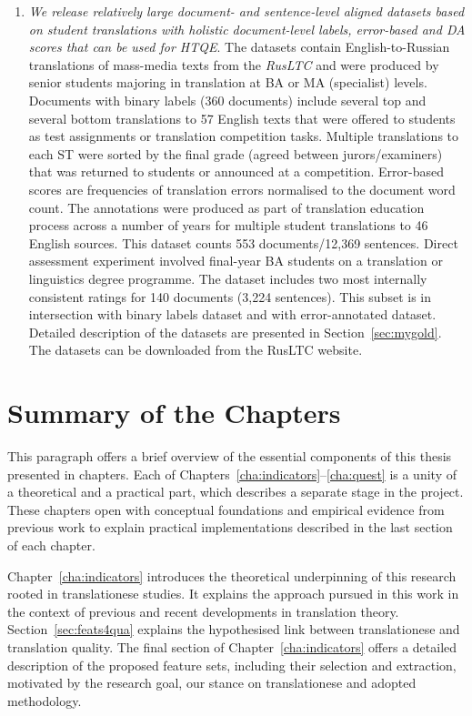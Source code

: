 \begin{enumerate}
	\item \textit{We release relatively large document- and sentence-level aligned datasets based on student translations with holistic document-level labels, error-based and DA scores that can be used for \gls{HTQE}}.
	The datasets contain English-to-Russian translations of mass-media texts from the \textit{RusLTC} and were produced by senior students majoring in translation at BA or MA (specialist) levels. 
	Documents with binary labels (360 documents) include several top and several bottom translations to 57 English texts that were offered to students as test assignments or translation competition tasks. Multiple translations to each ST were sorted by the final grade (agreed between jurors/examiners) that was returned to students or announced at a competition.
	Error-based scores are frequencies of translation errors normalised to the document word count. The annotations were produced as part of translation education process across a number of years for multiple student translations to 46 English sources. This dataset counts 553 documents/12,369 sentences.
	Direct assessment experiment involved final-year BA students on a translation or linguistics degree programme. The dataset includes two most internally consistent ratings for 140 documents (3,224 sentences). This subset is in intersection with binary labels dataset and with error-annotated dataset.
	Detailed description of the datasets are presented in Section~\ref{sec:mygold}. The datasets can be downloaded from the RusLTC website.
	
\end{enumerate}
\section{Summary of the Chapters}
This paragraph offers a brief overview of the essential components of this thesis presented in chapters.
Each of Chapters~\ref{cha:indicators}--\ref{cha:quest} is a unity of a theoretical and a practical part, which describes a separate stage in the project. These chapters open with conceptual foundations and empirical evidence from previous work to explain practical implementations described in the last section of each chapter. 

Chapter~\ref{cha:indicators} introduces the theoretical underpinning of this research rooted in translationese studies. It explains the approach pursued in this work in the context of previous and recent developments in translation theory.
Section~\ref{sec:feats4qua} explains the hypothesised link between translationese and translation quality. The final section of Chapter~\ref{cha:indicators} offers a detailed description of the proposed feature sets, including their selection and extraction, motivated by the research goal, our stance on translationese and adopted methodology.

